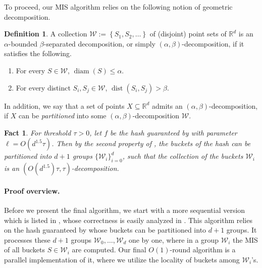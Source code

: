 \documentclass[11pt,letterpaper]{article}
\theoremstyle{plain}
\newtheorem{fact}[theorem]{Fact}
\theoremstyle{definition}
\newtheorem{definition}[theorem]{Definition}
\theoremstyle{remark}
\DeclareMathOperator{\dist}{dist}
\DeclareMathOperator{\diam}{diam}
\begin{document}
To proceed, our MIS algorithm relies on the following notion of geometric decomposition.











\begin{definition}
    \label{def:decomposition}
    A collection $\mathcal{W}:=\left\{S_{1}, S_{2}, \ldots\right\}$  of (disjoint) point sets of $\mathbb{R}^{d}$ is an $\alpha$-bounded $\beta$-separated decomposition, or simply $(\alpha, \beta)$-decomposition, if it satisfies the following.
    \begin{enumerate}
        \item For every $S\in \mathcal{W}$, $\diam(S)\leq \alpha$.
        \item For every distinct $S_{i}, S_{j}\in \mathcal{W}$, $\dist(S_{i}, S_{j})>\beta$.
    \end{enumerate}
    In addition, we say that a set of points $X\subseteq \mathbb{R}^{d}$ admits an $(\alpha, \beta)$-decomposition, if $X$ can be \emph{partitioned} into some $(\alpha, \beta)$-decomposition $\mathcal{W}$.
\end{definition}



\begin{fact}
    \label{fact:partition}
    For threshold $\tau > 0$, let $f$ be the hash guaranteed by  with parameter $\ell = O(d^{1.5}\tau)$.
    Then by the second property of ,
    the buckets of the hash can be partitioned into $d + 1$ groups $\{\mathcal{W}_i\}_{i=0}^d$, 
    such that the collection of the buckets $\mathcal{W}_i$ is an $(O(d^{1.5})\tau, \tau)$-decomposition.
\end{fact}






















\paragraph{Proof overview.} 
Before we present the final algorithm, we start with a more sequential version which is listed in , whose correctness is easily analyzed in . 
This algorithm relies on the hash guaranteed by  whose buckets can be partitioned into $d + 1$ groups.
It processes these $d + 1$ groups $\mathcal{W}_0, \ldots, \mathcal{W}_d$ one by one, where in a group $\mathcal{W}_i$ the MIS of all buckets $S \in \mathcal{W}_i$ are computed.
Our final $O(1)$-round algorithm is a parallel implementation of it, where we utilize the locality of buckets among $\mathcal{W}_i$'s.
\end{document}
